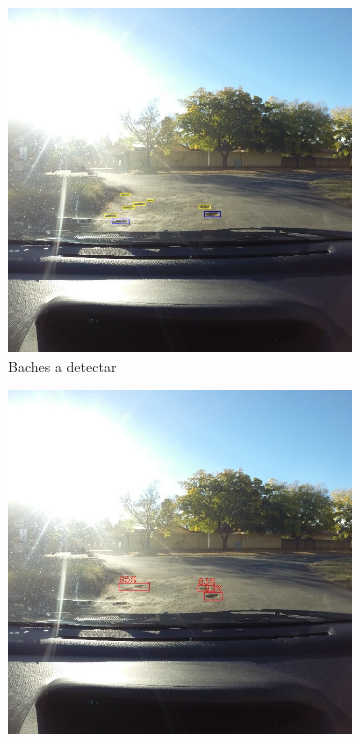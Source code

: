 \begin{figure}[H]
	\centering
	\begin{subfigure}[h]{0.45\linewidth}
		\includegraphics[width=\linewidth]{images/results_b_gt.jpg}
		\caption{Baches a detectar}
	\end{subfigure}
	\begin{subfigure}[h]{0.45\linewidth}
		\includegraphics[width=\linewidth]{images/results_b_yolo_v3_256.jpg}

\end{subfigure}
\end{figure}
